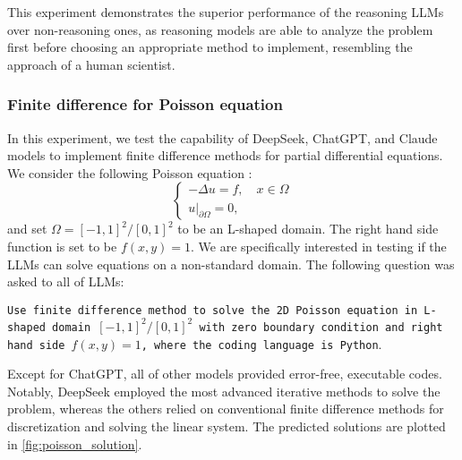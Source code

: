 \documentclass{article}
\begin{document}
This experiment demonstrates the superior performance of the reasoning LLMs over non-reasoning ones, as reasoning models are able to analyze the problem first before choosing an appropriate method to implement, resembling the approach of a human scientist. 


\subsubsection{Finite difference for Poisson equation}

In this experiment, we test the capability of DeepSeek, ChatGPT, and Claude models to implement finite difference methods for partial differential equations. We consider the following Poisson equation \cite{buzbee1970direct}:
\begin{equation*}
    \left\{ \begin{array}{l}
          -\Delta u = f, \quad x \in \Omega  \\
          u|_{\partial \Omega} = 0,
    \end{array}
    \right.
\end{equation*}
and set $\Omega = [-1,1]^{2}/[0,1]^{2}$ to be an L-shaped domain. The right hand side function is set to be $f(x, y) = 1$. We are specifically interested in testing if the LLMs can solve equations on a non-standard domain. The following question was asked to all of LLMs:

\texttt{Use finite difference method to solve the 2D Poisson equation in L-shaped domain $[-1,1]^{2}/[0, 1]^{2}$ with zero boundary condition and right hand side $f(x,y) = 1$, where the coding language is \texttt{Python}}. 

Except for ChatGPT, all of other models provided error-free, executable codes. Notably, DeepSeek employed the most advanced iterative methods to solve the problem, whereas the others relied on conventional finite difference methods for discretization and solving the linear system. The predicted solutions are plotted in \autoref{fig:poisson_solution}.
\end{document}

